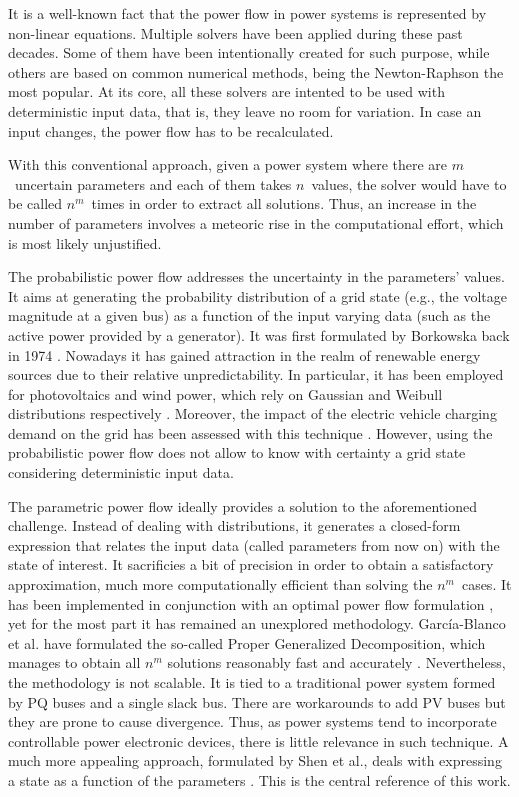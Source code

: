 It is a well-known fact that the power flow in power systems is represented by non-linear equations. Multiple solvers have been applied during these past decades. Some of them have been intentionally created for such purpose, while others are based on common numerical methods, being the Newton-Raphson the most popular. At its core, all these solvers are intented to be used with deterministic input data, that is, they leave no room for variation. In case an input changes, the power flow has to be recalculated.

With this conventional approach, given a power system where there are $m$~uncertain parameters and each of them takes $n$~values, the solver would have to be called $n^m$~times in order to extract all solutions. Thus, an increase in the number of parameters involves a meteoric rise in the computational effort, which is most likely unjustified. 

The probabilistic power flow addresses the uncertainty in the parameters' values. It aims at generating the probability distribution of a grid state (e.g., the voltage magnitude at a given bus) as a function of the input varying data (such as the active power provided by a generator). It was first formulated by Borkowska back in 1974 \cite{borkowska1974}. Nowadays it has gained attraction in the realm of renewable energy sources due to their relative unpredictability. In particular, it has been employed for photovoltaics and wind power, which rely on Gaussian and Weibull distributions respectively \cite{li2019, morales2010, fan2012}. Moreover, the impact of the electric vehicle charging demand on the grid has been assessed with this technique \cite{li2012}. However, using the probabilistic power flow does not allow to know with certainty a grid state considering deterministic input data. 

The parametric power flow ideally provides a solution to the aforementioned challenge. Instead of dealing with distributions, it generates a closed-form expression that relates the input data (called parameters from now on) with the state of interest. It sacrificies a bit of precision in order to obtain a satisfactory approximation, much more computationally efficient than solving the $n^m$~cases. It has been implemented in conjunction with an optimal power flow formulation \cite{almeida1994}, yet for the most part it has remained an unexplored methodology. García-Blanco et al. have formulated the so-called Proper Generalized Decomposition, which manages to obtain all $n^m$ solutions reasonably fast and accurately \cite{garcia2017, blanco2017}. Nevertheless, the methodology is not scalable. It is tied to a traditional power system formed by PQ buses and a single slack bus. There are workarounds to add PV buses but they are prone to cause divergence. Thus, as power systems tend to incorporate controllable power electronic devices, there is little relevance in such technique. A much more appealing approach, formulated by Shen et al., deals with expressing a state as a function of the parameters \cite{shen2020}. This is the central reference of this work. 

